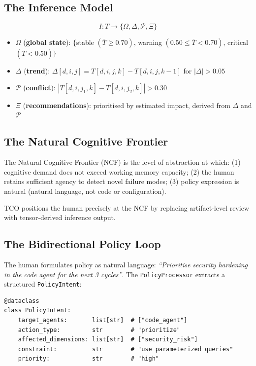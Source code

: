 \documentclass[manuscript,review,anonymous]{acmart}
\begin{document}
\subsection{The Inference Model}

\begin{equation}
  I: T \rightarrow \{\Omega, \Delta, \mathcal{P}, \Xi\}
\end{equation}

\begin{itemize}
  \item $\Omega$ (\textbf{global state}): $\{$stable $(\bar{T} \geq 0.70)$, warning
    $(0.50 \leq \bar{T} < 0.70)$, critical $(\bar{T} < 0.50)\}$
  \item $\Delta$ (\textbf{trend}): $\Delta[d,i,j] = T[d,i,j,k] - T[d,i,j,k-1]$
    for $|\Delta| > 0.05$
  \item $\mathcal{P}$ (\textbf{conflict}): $|T[d,i,j_1,k] - T[d,i,j_2,k]| > 0.30$
  \item $\Xi$ (\textbf{recommendations}): prioritised by estimated impact, derived
    from $\Delta$ and $\mathcal{P}$
\end{itemize}

\subsection{The Natural Cognitive Frontier}

The Natural Cognitive Frontier (NCF) is the level of abstraction at which:
(1) cognitive demand does not exceed working memory capacity;
(2) the human retains sufficient agency to detect novel failure modes;
(3) policy expression is natural (natural language, not code or configuration).

TCO positions the human precisely at the NCF by replacing artifact-level review with
tensor-derived inference output.

\subsection{The Bidirectional Policy Loop}

The human formulates policy as natural language: \textit{``Prioritise security
hardening in the code agent for the next 3 cycles''}. The
\texttt{PolicyProcessor} extracts a structured \texttt{PolicyIntent}:

\begin{lstlisting}[caption={PolicyIntent structured extraction}]
@dataclass
class PolicyIntent:
    target_agents:       list[str]  # ["code_agent"]
    action_type:         str        # "prioritize"
    affected_dimensions: list[str]  # ["security_risk"]
    constraint:          str        # "use parameterized queries"
    priority:            str        # "high"
\end{lstlisting}
\end{document}
